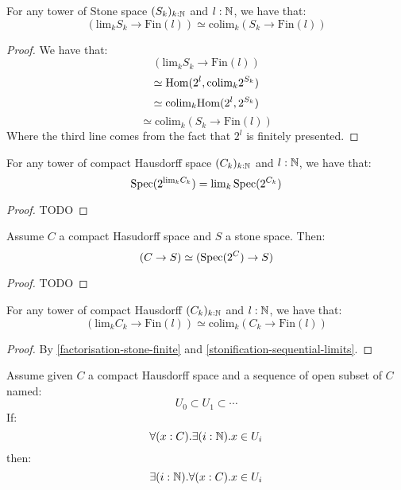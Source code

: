 \begin{lemma}\label{factorisation-stone-finite}
For any tower of Stone space $(S_k)_{k:\mathbb{N}}$ and $l:\mathbb{N}$, we have that:
\[\left(\mathrm{lim}_kS_k\to \mathrm{Fin}(l)\right) \simeq \mathrm{colim}_k (S_k\to \mathrm{Fin}(l))\]
\end{lemma}

\begin{proof}
We have that:
\[\left(\mathrm{lim}_kS_k\to \mathrm{Fin}(l)\right) \]
\[\simeq \mathrm{Hom}(2^l, \mathrm{colim}_k 2^{S_k})\]
\[\simeq \mathrm{colim}_k \mathrm{Hom}(2^l, 2^{S_k}) \]
\[\simeq \mathrm{colim}_k (S_k\to \mathrm{Fin}(l))\]
Where the third line comes from the fact that $2^l$ is finitely presented.
\end{proof}

\begin{lemma}\label{stonification-sequential-limits}
For any tower of compact Hausdorff space $(C_k)_{k:\mathbb{N}}$ and $l:\mathbb{N}$, we have that:
\[\operatorname{Spec}(2^{\mathrm{lim}_k C_k}) = \mathrm{lim}_k\operatorname{Spec}(2^{C_k})\]
\end{lemma}

\begin{proof}
TODO
\end{proof}

\begin{lemma}
Assume $C$ a compact Hasudorff space and $S$ a stone space. Then:
\[(C\to S) \simeq (\operatorname{Spec}(2^C) \to S)\]
\end{lemma}

\begin{proof}
TODO
\end{proof}

\begin{lemma}\label{factorisation-compact-hausdorff-finite}
For any tower of compact Hausdorff $(C_k)_{k:\mathbb{N}}$ and $l:\mathbb{N}$, we have that:
\[\left(\mathrm{lim}_kC_k\to \mathrm{Fin}(l)\right) \simeq \mathrm{colim}_k (C_k\to \mathrm{Fin}(l))\]
\end{lemma}

\begin{proof}
By \cref{factorisation-stone-finite} and \cref{stonification-sequential-limits}.
\end{proof}

\begin{lemma}\label{compact-hausforff-countable-cover}
Assume given $C$ a compact Hausdorff space and a sequence of open subset of $C$ named:
\[U_0\subset U_1 \subset \cdots\]
If:
\[\forall(x:C).\exists(i:\mathbb{N}). x\in U_i\]
then:
\[\exists(i:\mathbb{N}). \forall(x:C).x\in U_i\]
\end{lemma}

